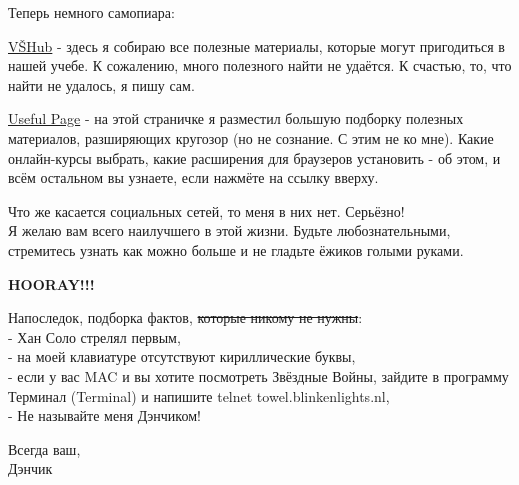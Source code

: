 \documentclass[a4paper,12pt]{article}
\begin{document}
Теперь немного самопиара:

\href{http://vshub.wordpress.com}{VŠHub} - здесь я собираю все полезные материалы, 
которые могут пригодиться в нашей учебе. К сожалению, много полезного найти не удаётся.
К счастью, то, что найти не удалось, я пишу сам.

\href{https://hunfauser.github.io/usefulpage/}{Useful Page} - на этой страничке 
я разместил большую подборку полезных материалов, разширяющих кругозор (но не сознание. 
С этим не ко мне). Какие онлайн-курсы выбрать, какие расширения для браузеров установить - об 
этом, и всём остальном вы узнаете, если нажмёте на ссылку вверху.

Что же касается социальных сетей, то меня в них нет. Серьёзно! \\

Я желаю вам всего наилучшего в этой жизни. Будьте любознательными, стремитесь узнать как можно больше
и не гладьте ёжиков голыми руками. \\

\vspace{7ex}

\textbf{HOORAY!!!}

\vspace{7ex}

Напоследок, подборка фактов, \sout{которые никому не нужны}: \\
- Хан Соло стрелял первым, \\
- на моей клавиатуре отсутствуют кириллические буквы, \\
- если у вас MAC и вы хотите посмотреть Звёздные Войны, 
зайдите в программу Терминал (Terminal) и напишите telnet towel.blinkenlights.nl, \\
- Не называйте меня Дэнчиком!

\centering
\vfill
Всегда ваш, \\
Дэнчик
\end{document}
